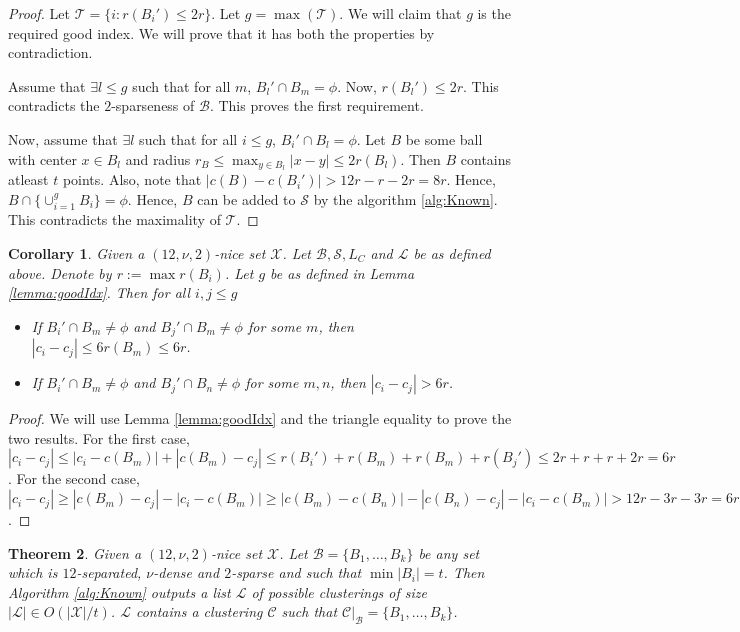 \documentclass[twoside]{article}
\newcommand{\mc}{\mathcal}
\newtheorem{theorem}{Theorem}
\newtheorem{corollary}[theorem]{Corollary}
\begin{document}
\begin{proof}
Let $\mc T = \{i: r(B_i') \le 2r\}$. Let $g = \max(\mc T)$. We will claim that $g$ is the required good index. We will prove that it has both the properties by contradiction. 

Assume that $\exists l \le g$ such that for all $m$, $B_l' \cap B_m = \phi$. Now, $r(B_l') \le 2r$. This contradicts the $2$-sparseness of $\mc B$. This proves the first requirement.

Now, assume that $\exists l$ such that for all $i \le g$, $B_i' \cap B_l = \phi$. Let $B$ be some ball with center $x \in B_l$ and radius $r_B \le \max_{y \in B_l} |x-y| \le 2r(B_l)$. Then $B$ contains atleast $t$ points. Also, note that $|c(B)-c(B_i')| > 12r - r -2r = 8r$. Hence, $B \cap \{\cup_{i=1}^g B_i\} = \phi$. Hence, $B$ can be added to $\mc S$ by the algorithm \ref{alg:Known}. This contradicts the maximality of $\mc T$.
\end{proof}

\begin{corollary}
Given a $(12,\nu,2)$-nice set $\mc X$. Let $\mc B, \mc S, L_C$ and $\mc L$ be as defined above. Denote by $r := \max r(B_i)$. Let $g$ be as defined in Lemma \ref{lemma:goodIdx}. Then for all $i,j \le g$
\begin{itemize}[nolistsep,noitemsep]
\item If $B_i' \cap B_m \neq \phi$ and $B_j' \cap B_m\neq\phi$ for some $m$, then $|c_i-c_j| \le 6 r(B_m) \le 6r$.
\item If $B_i' \cap B_m \neq \phi$ and $B_j' \cap B_n\neq\phi$ for some $m,n$, then $|c_i-c_j| > 6r$.
\end{itemize}
\label{cor:centerDist}
\end{corollary}

\begin{proof}
We will use Lemma \ref{lemma:goodIdx} and the  triangle equality to prove the two results. For the first case, $|c_i-c_j| \le |c_i-c(B_m)| + |c(B_m)-c_j| \le r(B_i') + r(B_m) + r(B_m) + r(B_j') \le 2r + r + r + 2r = 6r$. For the second case, $|c_i-c_j| \ge  |c(B_m)-c_j| - |c_i-c(B_m)| \ge |c(B_m)-c(B_n)| - |c(B_n) - c_j| - |c_i-c(B_m)| > 12r - 3r -3r = 6r$.
\end{proof}

\begin{theorem}
\label{thm:givenT}
Given a $(12,\nu,2)$-nice set $\mc X$. Let $\mc B = \{B_1,\ldots,B_k\}$ be any set which is $12$-separated, $\nu$-dense and $2$-sparse and such that $\min |B_i| = t$. Then Algorithm \ref{alg:Known} outputs a list $\mc L$ of possible clusterings of size $|\mc L| \in O(|\mc X|/t)$. $\mc L$ contains a clustering $\mc C$ such that $\mc C|_{\mc B} = \{B_1,\ldots,B_k\}$.
\end{theorem}
\end{document}
